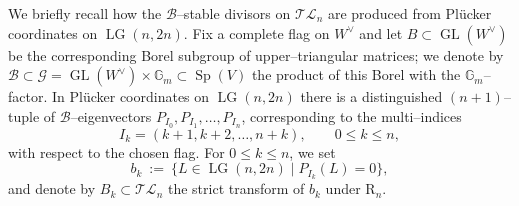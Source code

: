\documentclass[10pt]{amsart}
\theoremstyle{definition}
\newtheorem{remark}[theorem]{Remark}
\newcommand{\LG}{\operatorname{LG}}
\newcommand{\CQ}{\mathsf{CQ}}
\DeclareMathOperator{\Sp}{Sp}
\newcommand{\TL}{\mathcal{TL}}
\newcommand{\Quot}{\mathbin{/\mkern-5mu/}}
\newcommand{\GL}{\operatorname{GL}}
\newcommand{\Gm}{\mathbb{G}_m}
\newcommand{\PP}{\mathbb{P}}
\newcommand{\RL}{\mathrm{R}}
\newcommand{\PL}{\mathrm{P}}
\theoremstyle{plain} %
\begin{document}

We briefly recall how the $\mathscr{B}$--stable divisors on $\TL_n$ are produced from Plücker coordinates on $\LG(n,2n)$. Fix a complete flag on $W^\vee$ and let $B\subset\GL(W^\vee)$ be the corresponding
Borel subgroup of upper--triangular matrices; we denote by $\mathscr{B}\subset\mathscr G=\GL(W^\vee)\times\Gm\subset \Sp(V)$ the product of this Borel with the $\Gm$--factor.
In Plücker coordinates on $\LG(n,2n)$ there is a distinguished $(n+1)$--tuple of
$\mathscr{B}$--eigenvectors $P_{I_0},P_{I_1},\dots,P_{I_n}$, corresponding to the multi–indices
\[
I_k=(k+1,k+2,\dots,n+k),\qquad 0\le k\le n,
\]
with respect to the chosen flag.  For $0\le k\le n$, we set
\[
b_k\ :=\ \{L\in\LG(n,2n)\mid P_{I_k}(L)=0\},
\]
and denote by $B_k\subset\TL_n$ the strict transform of $b_k$ under $\RL_n$. 

\end{document}
